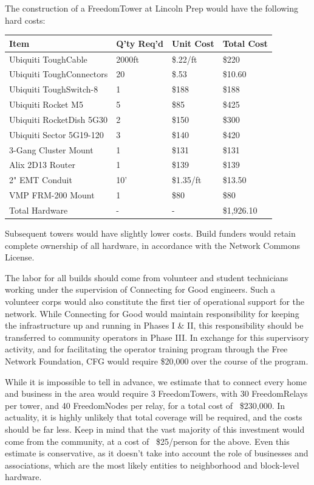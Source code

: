 The construction of a FreedomTower at Lincoln Prep would
have the following hard costs:
\begin{center}
\begin{tabular}{|p{5cm}|l|l|l|}
\hline
Item & Q'ty Req'd & Unit Cost & Total Cost \\ \hline
Ubiquiti ToughCable & 2000ft & \$.22/ft & \$220 \\ \hline
Ubiquiti ToughConnectors & 20 & \$.53 & \$10.60 \\ \hline
Ubiquiti ToughSwitch-8 & 1 & \$188 & \$188 \\ \hline
Ubiquiti Rocket M5 & 5 & \$85 & \$425 \\ \hline
Ubiquiti RocketDish 5G30 & 2 & \$150 & \$300 \\ \hline
Ubiquiti Sector 5G19-120 & 3 & \$140 & \$420 \\ \hline
3-Gang Cluster Mount & 1 & \$131 & \$131 \\ \hline
Alix 2D13 Router & 1 & \$139 & \$139 \\ \hline
2" EMT Conduit & 10' & \$1.35/ft & \$13.50 \\ \hline
VMP FRM-200 Mount & 1 & \$80 & \$80 \\ \hline
Total Hardware & - & - & \$1,926.10 \\ \hline
\end{tabular}
\end{center}
Subsequent towers would have slightly lower costs. Build funders would retain
complete ownership of all hardware, in accordance with the Network Commons
License.\par

The labor for all builds should come from volunteer and student technicians working
under the supervision of Connecting for Good engineers. Such a volunteer corps
would also constitute the first tier of operational support for the network.
While Connecting for Good would maintain responsibility for keeping the
infrastructure up and running in Phases I \& II, this responsibility should be
transferred to community operators in Phase III. In exchange for this
supervisory activity, and for facilitating the operator training program through
the Free Network Foundation, CFG would require \$20,000 over the course of the
program. \par

While it is impossible to tell in advance, we
estimate that to connect every home and business in
the area would require 3 FreedomTowers, with 30 FreedomRelays per tower, and 40
FreedomNodes per relay, for a total cost of ~\$230,000. In actuality, it is
highly unlikely that total coverage will be required, and the costs should be
far less. Keep in mind that the vast majority of this investment would come from
the community, at a cost of ~\$25/person for the above. Even this estimate is conservative, as
it doesn't take into account the role of businesses and associations, which are
the most likely entities to neighborhood and block-level hardware. \par


